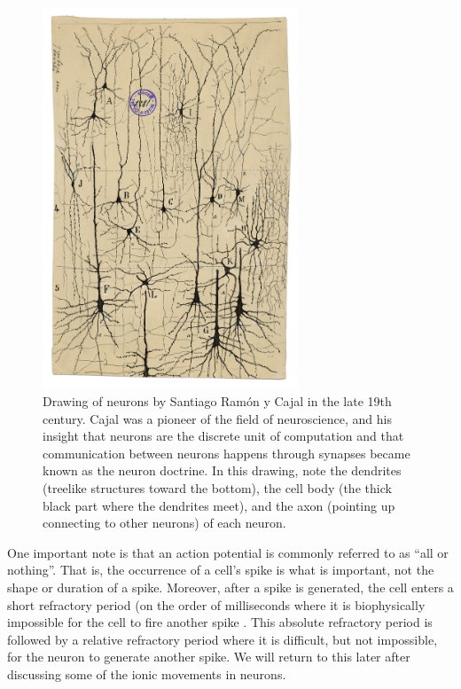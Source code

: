 \documentclass[11pt]{article}
\begin{document}
\begin{figure}[H]
    \centering
    \includegraphics[width=3in]{figures/cajal_neuron.png}
    \caption{Drawing of neurons by Santiago Ram\'{o}n y Cajal in the late 19th century. Cajal was a pioneer of the field of neuroscience, and his insight that neurons are the discrete unit of computation and that communication between neurons happens through synapses became known as the neuron doctrine. In this drawing, note the dendrites (treelike structures toward the bottom), the cell body (the thick black part where the dendrites meet), and the axon (pointing up connecting to other neurons) of each neuron.}
    \label{fig:cajal_neuron}
\end{figure}

One important note is that an action potential is commonly referred to as ``all or nothing''. That is, the occurrence of a cell's spike is what is important, not the shape or duration of a spike. Moreover, after a spike is generated, the cell enters a short refractory period (on the order of milliseconds where it is biophysically impossible for the cell to fire another spike \citep{neuroscience_2nd_edition}. This absolute refractory period is followed by a relative refractory period where it is difficult, but not impossible, for the neuron to generate another spike. We will return to this later after discussing some of the ionic movements in neurons.
\end{document}
